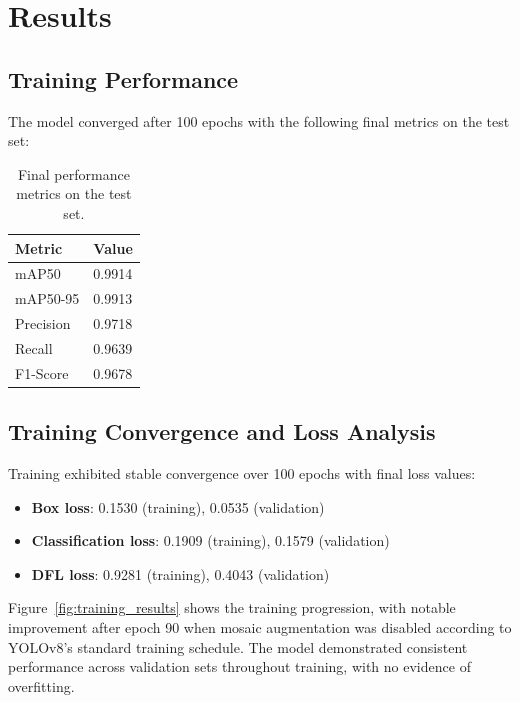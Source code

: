 \documentclass[10pt,twocolumn]{article}
\begin{document}
\section{Results}

\subsection{Training Performance}

The model converged after 100 epochs with the following final metrics on the test set:

\begin{table}[H]
\centering
\begin{tabular}{@{}ll@{}}
\toprule
\textbf{Metric} & \textbf{Value} \\
\midrule
mAP50 & 0.9914 \\
mAP50-95 & 0.9913 \\
Precision & 0.9718 \\
Recall & 0.9639 \\
F1-Score & 0.9678 \\
\bottomrule
\end{tabular}
\caption{Final performance metrics on the test set.}
\label{tab:performance}
\end{table}

\subsection{Training Convergence and Loss Analysis}

Training exhibited stable convergence over 100 epochs with final loss values:
\begin{itemize}
\item \textbf{Box loss}: 0.1530 (training), 0.0535 (validation)
\item \textbf{Classification loss}: 0.1909 (training), 0.1579 (validation)
\item \textbf{DFL loss}: 0.9281 (training), 0.4043 (validation)
\end{itemize}

Figure~\ref{fig:training_results} shows the training progression, with notable improvement after epoch 90 when mosaic augmentation was disabled according to YOLOv8's standard training schedule. The model demonstrated consistent performance across validation sets throughout training, with no evidence of overfitting.
\end{document}
